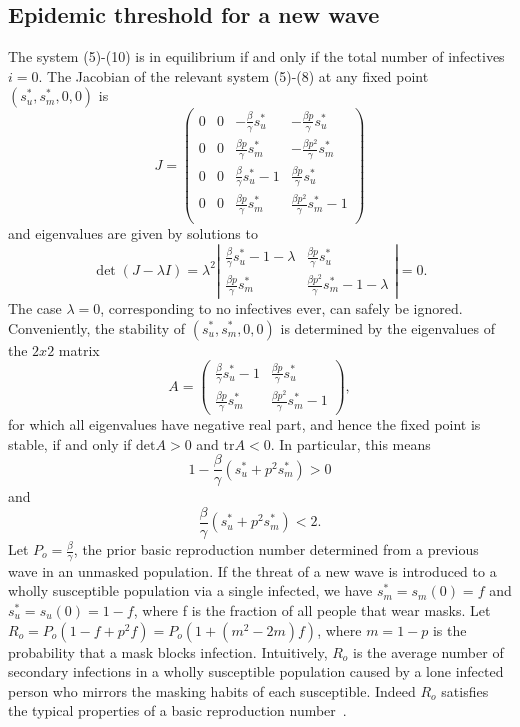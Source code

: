\documentclass[11pt]{article}
\begin{document}
\subsection*{Epidemic threshold for a new wave}
The system (5)-(10) is in equilibrium if and only if the total number of infectives $i = 0$. The Jacobian of the relevant system (5)-(8) at any fixed point $(s_{u}^*,s_{m}^*,0,0)$ is
\[
  J =
   \begin{pmatrix}
    0 & 0 & - \frac{\beta }{\gamma} s_{u}^* & - \frac{\beta p }{\gamma} s_{u}^* \\
    0 & 0 & \frac{\beta p }{\gamma} s_{m}^* & - \frac{\beta p^{2} }{\gamma} s_{m}^* \\
    0 & 0 & \frac{\beta }{\gamma} s_{u}^* - 1 & \frac{\beta p }{\gamma} s_{u}^* \\
    0 & 0 &  \frac{\beta p }{\gamma} s_{m}^* & \frac{\beta p^{2} }{\gamma} s_{m}^* - 1 \\
   \end{pmatrix}
\]
and eigenvalues are given by solutions to
\[
  \det(J - \lambda I) = \lambda^{2}\left |
  \begin{matrix}
   \frac{\beta }{\gamma} s_{u}^* - 1 - \lambda & \frac{\beta p }{\gamma} s_{u}^* \\
    \frac{\beta p }{\gamma} s_{m}^* & \frac{\beta p^{2} }{\gamma} s_{m}^* - 1 - \lambda
  \end{matrix}
  \right | = 0.
\]
The case $\lambda = 0$, corresponding to no infectives ever, can safely be ignored. Conveniently, the stability of $(s_{u}^*,s_{m}^*,0,0)$ is determined by the eigenvalues of the $2x2$ matrix
\[A =
\begin{pmatrix}
   \frac{\beta }{\gamma} s_{u}^* - 1 & \frac{\beta p }{\gamma} s_{u}^* \\
    \frac{\beta p }{\gamma} s_{m}^* & \frac{\beta p^{2} }{\gamma} s_{m}^* - 1
\end{pmatrix},
\]
for which all eigenvalues have negative real part, and hence the fixed point is stable, if and only if $\text{det} A > 0$ and $\text{tr} A < 0$. In particular, this means
\[
  1 - \frac{\beta}{\gamma}(s_{u}^{*} + p^{2}s_{m}^{*}) > 0
\]
and
\[
  \frac{\beta}{\gamma}(s_{u}^{*} + p^{2}s_{m}^{*}) < 2.
\]
Let $P_{o} = \frac{\beta}{\gamma}$, the prior basic reproduction number determined from a previous wave in an unmasked population. If the threat of a new wave is introduced to a wholly susceptible population via a single infected, we have $s_{m}^* = s_{m}(0) = f$ and $s_{u}^* = s_{u}(0) = 1-f$, where f is the fraction of all people that wear masks. Let $R_{o} =   P_{o}(1 - f + p^{2}f) = P_{o}(1 + (m^{2}-2m)f)$, where $m = 1 - p$ is the probability that a mask blocks infection. Intuitively, $R_{o}$ is the average number of secondary infections in a wholly susceptible population caused by a lone infected person who mirrors the masking habits of each susceptible. Indeed $R_{o}$ satisfies the typical properties of a basic reproduction number~\cite{martcheva2015introduction}.
\end{document}

